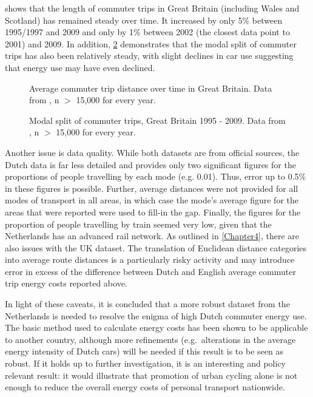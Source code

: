 shows that the length of commuter trips in Great
Britain (including Wales and Scotland) has remained steady over
time. It increased by only 5\% between 1995/1997 and 2009 and only by
1\% between 2002 (the closest data point to 2001) and 2009. In addition,
\cref{fmode-time-dft2011} demonstrates that the modal split of commuter trips
has also been relatively steady, with slight declines in car use suggesting that
energy use may have even declined. 

\begin{figure}
 \caption[Average commuter trip distance over time in Great Britain]
 {Average commuter trip distance over time in Great Britain. Data from
 \citet[table 9]{DfT2011-commuting}, n $>$ 15,000 for every year.} \label{fcommuterdistime}
\end{figure}

\begin{figure}
 \caption[Modal split of commuter trips, Great Britain 1995 - 2009]
 {Modal split of commuter trips, Great Britain 1995 - 2009. Data from
 \citet[table 9]{DfT2011-commuting}, n $>$ 15,000 for every year.} \label{fmode-time-dft2011}
\end{figure}

Another issue is data quality. While both datasets
are from official sources, the Dutch data is far less detailed and provides
only two significant figures for the proportions of people travelling by each
mode (e.g. 0.01). Thus, error up to 0.5\% in these figures is possible.
Further, average distances were not provided for all modes of transport in all
areas, in which case the mode's average figure for the areas that were reported
were used to fill-in the gap. Finally, the figures for the proportion of people
travelling by train seemed very low, given that the Netherlands has an
advanced rail network. As outlined in \cref{Chapter4}, %
there are also issues with the UK dataset. The translation of
Euclidean distance
categories into average route distances is a particularly risky
activity and may introduce error in excess of the difference between
Dutch and English average commuter trip energy costs reported above.

In light of these caveats, it is concluded that a 
more robust dataset from the Netherlands is needed to resolve the
enigma of high Dutch commuter energy use. The basic method used to calculate
energy costs has been shown to be applicable to another country,
although more refinements (e.g.~alterations in the average energy
intensity of Dutch cars) will be needed if this result is to be
seen as robust. If it holds up to further investigation, it is an interesting
and policy relevant result: it would illustrate that promotion of urban
cycling alone is not enough to reduce the overall energy costs of personal
transport nationwide.


